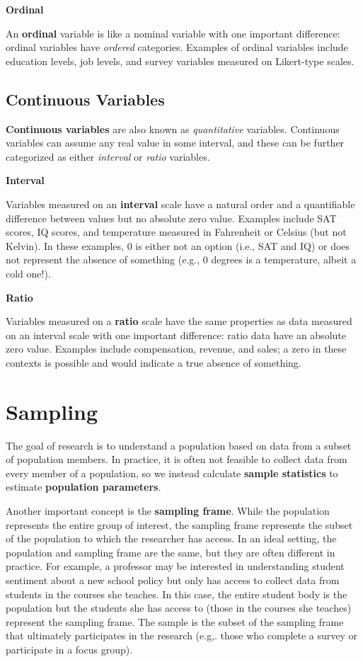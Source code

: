 \documentclass[]{book}
\begin{document}
\textbf{Ordinal}

An \textbf{ordinal} variable is like a nominal variable with one important difference: ordinal variables have \emph{ordered} categories. Examples of ordinal variables include education levels, job levels, and survey variables measured on Likert-type scales.

\hypertarget{continuous-variables}{%
\subsection{Continuous Variables}\label{continuous-variables}}

\textbf{Continuous variables} are also known as \emph{quantitative} variables. Continuous variables can assume any real value in some interval, and these can be further categorized as either \emph{interval} or \emph{ratio} variables.

\textbf{Interval}

Variables measured on an \textbf{interval} scale have a natural order and a quantifiable difference between values but no absolute zero value. Examples include SAT scores, IQ scores, and temperature measured in Fahrenheit or Celsius (but not Kelvin). In these examples, 0 is either not an option (i.e., SAT and IQ) or does not represent the absence of something (e.g., 0 degrees is a temperature, albeit a cold one!).

\textbf{Ratio}

Variables measured on a \textbf{ratio} scale have the same properties as data measured on an interval scale with one important difference: ratio data have an absolute zero value. Examples include compensation, revenue, and sales; a zero in these contexts is possible and would indicate a true absence of something.

\hypertarget{sampling}{%
\section{Sampling}\label{sampling}}

The goal of research is to understand a population based on data from a subset of population members. In practice, it is often not feasible to collect data from every member of a population, so we instead calculate \textbf{sample statistics} to estimate \textbf{population parameters}.

Another important concept is the \textbf{sampling frame}. While the population represents the entire group of interest, the sampling frame represents the subset of the population to which the researcher has access. In an ideal setting, the population and sampling frame are the same, but they are often different in practice. For example, a professor may be interested in understanding student sentiment about a new school policy but only has access to collect data from students in the courses she teaches. In this case, the entire student body is the population but the students she has access to (those in the courses she teaches) represent the sampling frame. The sample is the subset of the sampling frame that ultimately participates in the research (e.g,. those who complete a survey or participate in a focus group).
\end{document}
